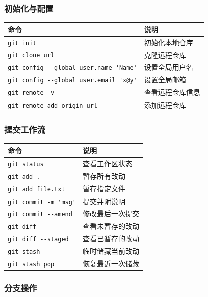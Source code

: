\subsubsection{初始化与配置}

\begin{center}
\begin{tabular}{ll}
\toprule
命令 & 说明 \\
\midrule
\verb|git init| & 初始化本地仓库 \\
\verb|git clone url| & 克隆远程仓库 \\
\verb|git config --global user.name 'Name'| & 设置全局用户名 \\
\verb|git config --global user.email 'x@y'| & 设置全局邮箱 \\
\verb|git remote -v| & 查看远程仓库信息 \\
\verb|git remote add origin url| & 添加远程仓库 \\
\bottomrule
\end{tabular}
\end{center}

\subsubsection{提交工作流}

\begin{center}
\begin{tabular}{ll}
\toprule
命令 & 说明 \\
\midrule
\verb|git status| & 查看工作区状态 \\
\verb|git add .| & 暂存所有改动 \\
\verb|git add file.txt| & 暂存指定文件 \\
\verb|git commit -m 'msg'| & 提交并附说明 \\
\verb|git commit --amend| & 修改最后一次提交 \\
\verb|git diff| & 查看未暂存的改动 \\
\verb|git diff --staged| & 查看已暂存的改动 \\
\verb|git stash| & 临时储藏当前改动 \\
\verb|git stash pop| & 恢复最近一次储藏 \\
\bottomrule
\end{tabular}
\end{center}

\subsubsection{分支操作}


